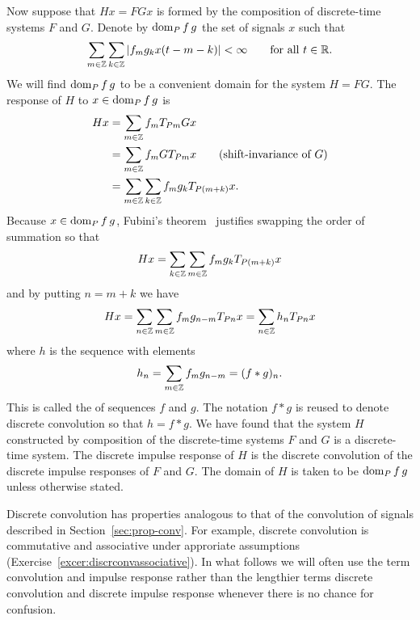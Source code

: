 Now suppose that $Hx = F Gx$ is formed by the composition of discrete-time systems $F$ and $G$.  Denote by $\operatorname{dom}_P f\,g$ the set of signals $x$ such that
\[
\sum_{m \in {\mathbb Z}} \sum_{k \in {\mathbb Z}} \left\vert f_m g_k x(t - m - k) \right\vert < \infty \qquad \text{for all $t \in {\mathbb R}$}. 
\]  
We will find $\operatorname{dom}_P f\,g$ to be a convenient domain for the system $H = FG$.  The response of $H$ to $x \in \operatorname{dom}_P f\,g$ is
\begin{align*}
H x &= \sum_{m \in {\mathbb Z}} f_m T_{Pm} G x  \\
&= \sum_{m \in {\mathbb Z}} f_m  G T_{Pm} x  \qquad \text{(shift-invariance of $G$)} \\
&= \sum_{m \in {\mathbb Z}} \sum_{k \in {\mathbb Z}} f_m g_k T_{P(m+k)}x.
\end{align*}
Because $x \in \operatorname{dom}_P f\,g$, Fubini's theorem~\cite[Theorem~8.8]{Rudin_real_and_complex_analysis} justifies swapping the order of summation so that
\[
H x = \sum_{k \in {\mathbb Z}} \sum_{m \in {\mathbb Z}} f_m g_k T_{P(m+k)}x
\]
and by putting $n = m+k$ we have
\begin{align}
Hx =  \sum_{n \in {\mathbb Z}} \sum_{m \in {\mathbb Z}} f_m g_{n-m} T_{Pn}x = \sum_{n \in {\mathbb Z}} h_n T_{Pn}x \nonumber
\end{align}
where $h$ is the sequence with elements
\[
h_n = \sum_{m \in {\mathbb Z}} f_m g_{n-m} = (f * g)_n .
\]
This is called the  of sequences $f$ and $g$.  The notation $f * g$ is reused to denote discrete convolution so that $h = f * g$.  We have found that the system $H$ constructed by composition of the discrete-time systems $F$ and $G$ is a discrete-time system.  The discrete impulse response of $H$ is the discrete convolution of the discrete impulse responses of $F$ and $G$.  The domain of $H$ is taken to be $\operatorname{dom}_P f\,g$ unless otherwise stated.  

Discrete convolution has properties analogous to that of the convolution of signals described in Section~\ref{sec:prop-conv}.  For example, discrete convolution is commutative and associative under approriate assumptions (Exercise~\ref{excer:discrconvassociative}).
In what follows we will often use the term convolution and impulse response rather than the lengthier terms discrete convolution and discrete impulse response whenever there is no chance for confusion.

